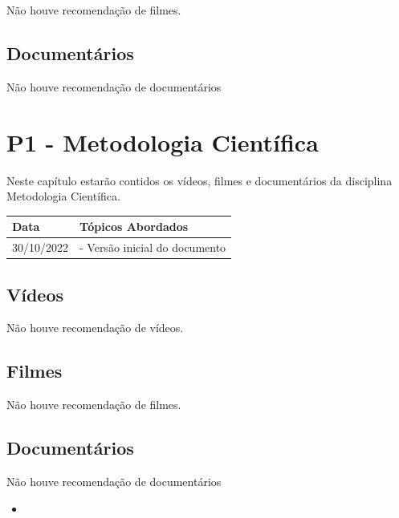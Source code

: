 \documentclass[
]{book}
\providecommand{\tightlist}{%
  \setlength{\itemsep}{0pt}\setlength{\parskip}{0pt}}
\begin{document}
Não houve recomendação de filmes.

\hypertarget{documentuxe1rios-3}{%
\section{Documentários}\label{documentuxe1rios-3}}

Não houve recomendação de documentários

\hypertarget{p1---metodologia-cientuxedfica}{%
\chapter{P1 - Metodologia Científica}\label{p1---metodologia-cientuxedfica}}

Neste capítulo estarão contidos os vídeos, filmes e documentários da disciplina Metodologia Científica.

\begin{longtable}[]{@{}ll@{}}
\toprule()
Data & Tópicos Abordados \\
\midrule()
\endhead
30/10/2022 & - Versão inicial do documento \\
\bottomrule()
\end{longtable}

\hypertarget{vuxeddeos-4}{%
\section{Vídeos}\label{vuxeddeos-4}}

Não houve recomendação de vídeos.

\hypertarget{filmes-4}{%
\section{Filmes}\label{filmes-4}}

Não houve recomendação de filmes.

\hypertarget{documentuxe1rios-4}{%
\section{Documentários}\label{documentuxe1rios-4}}

Não houve recomendação de documentários

\begin{itemize}
\tightlist
\item
\end{itemize}

  
\end{document}
